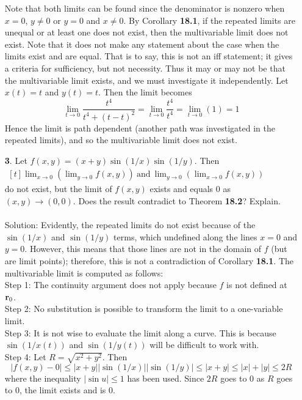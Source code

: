 \documentclass[12pt]{amsbook}
\begin{document}
\begin{enumerate}
Note that both limits can be found since the denominator is nonzero when $x=0$, $y\neq 0$ or $y=0$ and $x\neq 0$. By Corollary {\bf 18.1}, if the repeated limits are unequal or at least one does not exist, then the multivariable limit does not exist. Note that it does not make any statement about the case when the limits exist and are equal. That is to say, this is not an iff statement; it gives a criteria for sufficiency, but not necessity. Thus it may or may not be that the multivariable limit exists, and we must investigate it independently. Let $x(t)=t$ and $y(t)=t$. Then the limit becomes
$$\lim_{t \rightarrow 0}\frac{t^4}{t^4+(t-t)^2}=\lim_{t \rightarrow 0}\frac{t^4}{t^4}=\lim_{t \rightarrow 0}(1)=1$$
Hence the limit is path dependent (another path was investigated in the repeated limits), and so the multivariable limit does not exist.
\\
\item[{\small\bf 3}.] Let $f(x,y)=(x+y)\sin(1/x)\sin(1/y)$. Then
\\ $\! \begin{aligned}[t]
\lim_{x \rightarrow 0}(\lim_{y \rightarrow 0}f(x,y)) \ \text{and} \ \lim_{y \rightarrow 0}(\lim_{x \rightarrow 0}f(x,y))
\end{aligned}$ 
\\
do not exist, but the limit of $f(x,y)$ exists and equals $0$ as $(x,y) \rightarrow (0,0)$. Does the result contradict to Theorem {\bf 18.2}? Explain.
\\
\\
{\sc Solution}: Evidently, the repeated limits do not exist because of the $\sin(1/x)$ and $\sin(1/y)$ terms, which undefined along the lines $x=0$ and $y=0$. However, this means that those lines are not in the domain of $f$ (but are limit points); therefore, this is not a contradiction of Corollary {\bf 18.1}. The multivariable limit is computed as follows:
\\
{\sf Step 1}: The continuity argument does not apply because $f$ is not defined at ${\bf r}_0$.
\\
{\sf Step 2}: No substitution is possible to transform the limit to a one-variable
limit.
\\
{\sf Step 3}: It is not wise to evaluate the limit along a curve. This is because $\sin(1/x(t))$ and $\sin(1/y(t))$ will be difficult to work with. 
\\
{\sf Step 4}: Let $R=\sqrt{x^2+y^2}$. Then
$$|f(x,y)-0|\leq |x+y||\sin(1/x)||\sin(1/y)|\leq |x+y| \leq |x|+|y|\leq 2R$$
where the inequality $|\sin u|\leq 1$ has been used. Since $2R$ goes to $0$ as $R$ goes to $0$, the limit exists and is $0$.
\end{enumerate}
\end{document}

